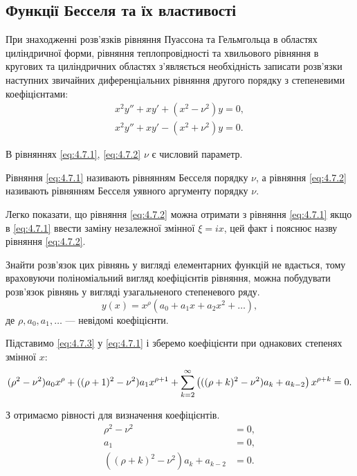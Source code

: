 \subsection{Функції Бесселя та їх властивості}

При знаходженні розв'язків рівняння Пуассона та Гельмгольца в областях циліндричної форми, рівняння теплопровідності та хвильового рівняння в кругових та циліндричних областях з'являється необхідність записати розв'язки наступних звичайних диференціальних рівняння другого порядку з степеневими коефіцієнтами:
\begin{gather}
	\label{eq:4.7.1}
	x^2 y'' + x y' + (x^2 - \nu^2) y = 0, \\
	\label{eq:4.7.2}
	x^2 y'' + x y' - (x^2 + \nu^2) y = 0.
\end{gather}

В рівняннях \eqref{eq:4.7.1}, \eqref{eq:4.7.2} $\nu$ є числовий параметр.

\begin{definition}
	Рівняння \eqref{eq:4.7.1} називають рівнянням Бесселя порядку $\nu$, а рівняння \eqref{eq:4.7.2} називають рівнянням Бесселя уявного аргументу порядку $\nu$.
\end{definition}

Легко показати, що рівняння \eqref{eq:4.7.2} можна отримати з рівняння \eqref{eq:4.7.1} якщо в \eqref{eq:4.7.1} ввести заміну незалежної змінної $\xi = i x$, цей факт і пояснює назву рівняння \eqref{eq:4.7.2}. \medskip

Знайти розв'язок цих рівнянь у вигляді елементарних функцій не вдається, тому враховуючи поліноміальний вигляд коефіцієнтів рівняння, можна побудувати розв'язок рівнянь у вигляді узагальненого степеневого ряду.
\begin{equation}
	\label{eq:4.7.3}
	y(x) = x^\rho (a_0 + a_1 x + a_2 x^2 + \ldots),
\end{equation}
де $\rho, a_0, a_1, \ldots$ --- невідомі коефіцієнти. \medskip

Підставимо \eqref{eq:4.7.3} у \eqref{eq:4.7.1} і зберемо коефіцієнти при однакових степенях змінної $x$:
\begin{equation}
	\label{eq:4.7.4}
	(\rho^2 - \nu^2) a_0 x^\rho + ((\rho + 1)^2 - \nu^2) a_1 x^{\rho + 1} + \displaystyle\sum\limits_{k = 2}^\infty \left( ((\rho + k)^2 - \nu^2) a_k + a_{k - 2} \right) x^{\rho + k} = 0.
\end{equation}

З  отримаємо рівності для визначення коефіцієнтів.
\begin{equation}
	\label{eq:4.7.5}
	\begin{aligned}
		\rho^2 - \nu^2 &= 0, \\
		a_1 &= 0, \\
		((\rho + k)^2 - \nu^2) a_k + a_{k - 2} &= 0.
	\end{aligned}
\end{equation}

